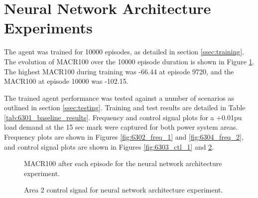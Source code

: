 \section{Neural Network Architecture Experiments}
The agent was trained for 10000 episodes, as detailed in section \ref{ssec:training}. The evolution of MACR100 over the 10000 episode duration is shown in Figure \ref{fig:6301_average_reward}. The highest MACR100 during training was -66.44 at episode 9720, and the MACR100 at episode 10000 was -102.15.

The trained agent performance was tested against a number of scenarios as outlined in section \ref{ssec:testing}. Training and test results are detailed in Table \ref{tab:6301_baseline_results}. Frequency and control signal plots for a +0.01pu load demand at the 15 sec mark were captured for both power system areas. Frequency plots are shown in Figures \ref{fig:6302_freq_1} and \ref{fig:6304_freq_2}, and control signal plots are shown in Figures \ref{fig:6303_ctl_1} and \ref{fig:6305_ctl_2}.

\vspace{2cm}

\begin{figure}[h]
	\centering
	
	\caption{MACR100 after each episode for the neural network architecture experiment.}\label{fig:6301_average_reward}
\end{figure}



\begin{figure}[h]
	\centering
	
	
	\vspace{-0.5cm}
	\caption{Area 1 frequency response for neural network architecture experiment.}\label{fig:6302_freq_1}
	
	\vspace{0.5cm}
	
	
	\vspace{-0.5cm}
	\caption{Area 1 control signal for neural network architecture experiment.}\label{fig:6303_ctl_1}
	
	\vspace{0.5cm}
	
	
	\vspace{-0.5cm}
	\caption{Area 2 frequency response for neural network architecture experiment.}\label{fig:6304_freq_2}
	
	\vspace{0.5cm}
			
	
	\vspace{-0.5cm}
	\caption{Area 2 control signal for neural network architecture experiment.}\label{fig:6305_ctl_2}
\end{figure}